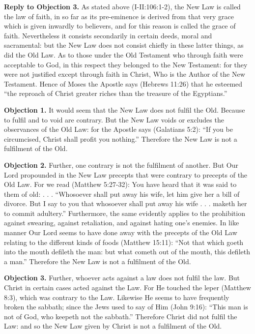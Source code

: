 \textbf{Reply to Objection 3.} As stated above (I-II:106:1-2), the New Law is called the law of faith, in so far as its pre-eminence is derived from that very grace which is given inwardly to believers, and for this reason is called the grace of faith. Nevertheless it consists secondarily in certain deeds, moral and sacramental: but the New Law does not consist chiefly in these latter things, as did the Old Law. As to those under the Old Testament who through faith were acceptable to God, in this respect they belonged to the New Testament: for they were not justified except through faith in Christ, Who is the Author of the New Testament. Hence of Moses the Apostle says (Hebrews 11:26) that he esteemed ``the reproach of Christ greater riches than the treasure of the Egyptians.''


\textbf{Objection 1.} It would seem that the New Law does not fulfil the Old. Because to fulfil and to void are contrary. But the New Law voids or excludes the observances of the Old Law: for the Apostle says (Galatians 5:2): ``If you be circumcised, Christ shall profit you nothing.'' Therefore the New Law is not a fulfilment of the Old.

\textbf{Objection 2.} Further, one contrary is not the fulfilment of another. But Our Lord propounded in the New Law precepts that were contrary to precepts of the Old Law. For we read (Matthew 5:27-32): You have heard that it was said to them of old: . . . ``Whosoever shall put away his wife, let him give her a bill of divorce. But I say to you that whosoever shall put away his wife . . . maketh her to commit adultery.'' Furthermore, the same evidently applies to the prohibition against swearing, against retaliation, and against hating one's enemies. In like manner Our Lord seems to have done away with the precepts of the Old Law relating to the different kinds of foods (Matthew 15:11): ``Not that which goeth into the mouth defileth the man: but what cometh out of the mouth, this defileth a man.'' Therefore the New Law is not a fulfilment of the Old.

\textbf{Objection 3.} Further, whoever acts against a law does not fulfil the law. But Christ in certain cases acted against the Law. For He touched the leper (Matthew 8:3), which was contrary to the Law. Likewise He seems to have frequently broken the sabbath; since the Jews used to say of Him (John 9:16): ``This man is not of God, who keepeth not the sabbath.'' Therefore Christ did not fulfil the Law: and so the New Law given by Christ is not a fulfilment of the Old.

